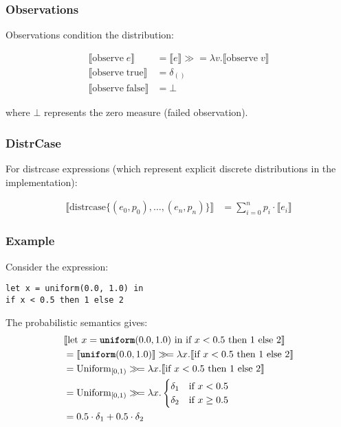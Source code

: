 \subsubsection{Observations}

Observations condition the distribution:

\begin{align*}
\llbracket \text{observe}\; e \rrbracket &= \llbracket e \rrbracket \gg\!= \lambda v. \llbracket \text{observe}\; v \rrbracket \\
\llbracket \text{observe}\; \text{true} \rrbracket &= \delta_{()} \\
\llbracket \text{observe}\; \text{false} \rrbracket &= \bot
\end{align*}

where $\bot$ represents the zero measure (failed observation).

\subsubsection{DistrCase}

For distrcase expressions (which represent explicit discrete distributions in the implementation):

\begin{align*}
\llbracket \text{distrcase}\{(e_0, p_0), \ldots, (e_n, p_n)\} \rrbracket &= \sum_{i=0}^n p_i \cdot \llbracket e_i \rrbracket
\end{align*}

\subsubsection{Example}

Consider the expression:
\begin{lstlisting}
let x = uniform(0.0, 1.0) in
if x < 0.5 then 1 else 2
\end{lstlisting}

The probabilistic semantics gives:
\begin{align*}
&\llbracket \text{let } x = \text{\ttfamily\bfseries uniform}(0.0, 1.0) \text{ in if } x < 0.5 \text{ then } 1 \text{ else } 2 \rrbracket \\
&= \llbracket \text{\ttfamily\bfseries uniform}(0.0, 1.0) \rrbracket \gg\!= \lambda x. \llbracket \text{if } x < 0.5 \text{ then } 1 \text{ else } 2 \rrbracket \\
&= \text{Uniform}_{[0,1)} \gg\!= \lambda x. \llbracket \text{if } x < 0.5 \text{ then } 1 \text{ else } 2 \rrbracket \\
&= \text{Uniform}_{[0,1)} \gg\!= \lambda x. \begin{cases}
    \delta_1 & \text{if } x < 0.5 \\
    \delta_2 & \text{if } x \geq 0.5
\end{cases} \\
&= 0.5 \cdot \delta_1 + 0.5 \cdot \delta_2
\end{align*}

